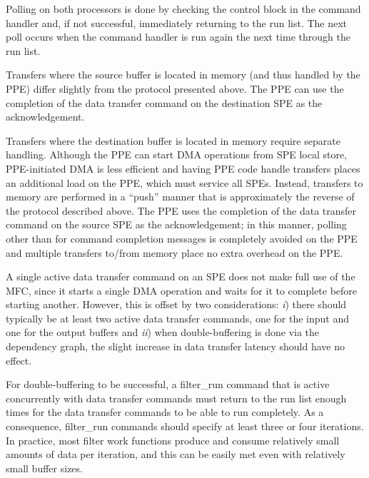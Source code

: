 Polling on both processors is done by checking the control block in the command handler and, if not successful, immediately returning to the run list. The next poll occurs when the command handler is run again the next time through the run list.

Transfers where the source buffer is located in memory (and thus handled by the PPE) differ slightly from the protocol presented above. The PPE can use the completion of the data transfer command on the destination SPE as the acknowledgement.

Transfers where the destination buffer is located in memory require separate handling. Although the PPE can start DMA operations from SPE local store, PPE-initiated DMA is less efficient and having PPE code handle transfers places an additional load on the PPE, which must service all SPEs. Instead, transfers to memory are performed in a ``push'' manner that is approximately the reverse of the protocol described above. The PPE uses the completion of the data transfer command on the source SPE as the acknowledgement; in this manner, polling other than for command completion messages is completely avoided on the PPE and multiple transfers to/from memory place no extra overhead on the PPE.

A single active data transfer command on an SPE does not make full use of the MFC, since it starts a single DMA operation and waits for it to complete before starting another. However, this is offset by two considerations: \emph{i}) there should typically be at least two active data transfer commands, one for the input and one for the output buffers and \emph{ii}) when double-buffering is done via the dependency graph, the slight increase in data transfer latency should have no effect.

For double-buffering to be successful, a \textsf{filter\_run} command that is active concurrently with data transfer commands must return to the run list enough times for the data transfer commands to be able to run completely. As a consequence, \textsf{filter\_run} commands should specify at least three or four iterations. In practice, most filter work functions produce and consume relatively small amounts of data per iteration, and this can be easily met even with relatively small buffer sizes.


